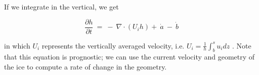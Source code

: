 If we integrate in the vertical, we get 

\begin{equation}
\frac{\partial h}{\partial t}~=~-~\nabla \cdot \left( U_{i} h \right) +~\dot{a}~-~\dot{b}
\label{eq:mascon11}
\end{equation}

in which $U_{i}$ represents the vertically averaged velocity, i.e. $U_i = \frac{1}{h}\int_{b}^{s}u_{i}dz$ . Note that this equation is 
prognostic; we can use the current velocity and geometry of the ice to compute a rate of change in the geometry.
